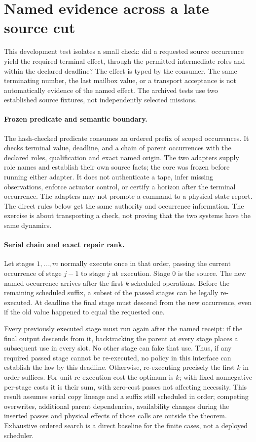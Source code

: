 \documentclass{article}
\begin{document}
\section*{Named evidence across a late source cut}
This development test isolates a small check: did a requested source
occurrence yield the required terminal effect, through the permitted
intermediate roles and within the declared deadline? The effect is
typed by the consumer. The same terminating number, the last mailbox
value, or a transport acceptance is not automatically evidence of
the named effect. The archived tests use two established source
fixtures, not independently selected missions.

\paragraph{Frozen predicate and semantic boundary.}
The hash-checked predicate consumes an ordered prefix of scoped
occurrences. It checks terminal value, deadline, and a chain of
parent occurrences with the declared roles, qualification and exact
named origin. The two adapters supply role names and establish their
own source facts; the core was frozen before running either adapter.
It does not authenticate a tape, infer missing observations, enforce
actuator control, or certify a horizon after the terminal occurrence.
The adapters may not promote a command to a physical state report.
The direct rules below get the same authority and occurrence
information. The exercise is about transporting a check, not proving
that the two systems have the same dynamics.

\paragraph{Serial chain and exact repair rank.}
Let stages $1,\ldots,m$ normally execute once in that order, passing
the current occurrence of stage $j-1$ to stage $j$ at execution.
Stage 0 is the source. The new named occurrence arrives after the
first $k$ scheduled operations. Before the remaining scheduled suffix,
a subset of the passed stages can be legally re-executed. At deadline
the final stage must descend from the new occurrence, even if the
old value happened to equal the requested one.

Every previously executed stage must run again after the named
receipt: if the final output descends from it, backtracking the
parent at every stage places a subsequent use in every slot. No
other stage can fake that use. Thus, if any required passed stage
cannot be re-executed, no policy in this interface can establish the
law by this deadline. Otherwise, re-executing precisely the first
$k$ in order suffices. For unit re-execution cost the optimum is
$k$; with fixed nonnegative per-stage costs it is their sum, with
zero-cost passes not affecting necessity. This result assumes serial
copy lineage and a suffix still scheduled in order; competing
overwrites, additional parent dependencies, availability changes
during the inserted passes and physical effects of those calls are
outside the theorem. Exhaustive ordered search is a direct baseline
for the finite cases, not a deployed scheduler.
\end{document}
